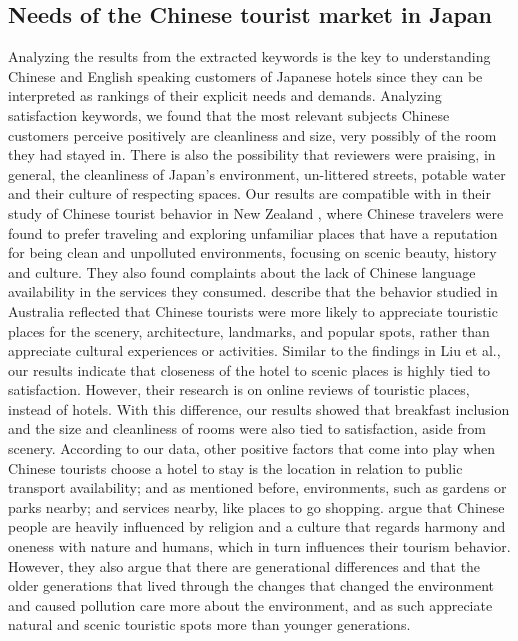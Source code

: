 \documentclass[review]{elsarticle}
\begin{document}
\subsection{Needs of the Chinese tourist market in Japan}\label{discussionneeds}

Analyzing the results from the extracted keywords is the key to understanding Chinese and English speaking customers of Japanese hotels since they can be interpreted as rankings of their explicit needs and demands. Analyzing satisfaction keywords, we found that the most relevant subjects Chinese customers perceive positively are cleanliness and size, very possibly of the room they had stayed in. There is also the possibility that reviewers were praising, in general, the cleanliness of Japan’s environment, un-littered streets, potable water and their culture of respecting spaces. Our results are compatible with \cite{ryan2001} in their study of Chinese tourist behavior in New Zealand , where Chinese travelers were found to prefer traveling and exploring unfamiliar places that have a reputation for being clean and unpolluted environments, focusing on scenic beauty, history and culture. They also found complaints about the lack of Chinese language availability in the services they consumed. \cite{LIU2019337} describe that the behavior studied in Australia reflected that Chinese tourists were more likely to appreciate touristic places for the scenery, architecture, landmarks, and popular spots, rather than appreciate cultural experiences or activities. Similar to the findings in Liu et al., our results indicate that closeness of the hotel to scenic places is highly tied to satisfaction. However, their research is on online reviews of touristic places, instead of hotels. With this difference, our results showed that breakfast inclusion and the size and cleanliness of rooms were also tied to satisfaction, aside from scenery. According to our data, other positive factors that come into play when Chinese tourists choose a hotel to stay is the location in relation to public transport availability; and as mentioned before, environments, such as gardens or parks nearby; and services nearby, like places to go shopping. \cite{gao2017chinese} argue that Chinese people are heavily influenced by religion and a culture that regards harmony and oneness with nature and humans, which in turn influences their tourism behavior. However, they also argue that there are generational differences and that the older generations that lived through the changes that changed the environment and caused pollution care more about the environment, and as such appreciate natural and scenic touristic spots more than younger generations.
\end{document}
